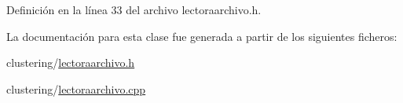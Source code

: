 Definición en la línea 33 del archivo lectoraarchivo.\-h.



La documentación para esta clase fue generada a partir de los siguientes ficheros\-:\begin{DoxyCompactItemize}
\item 
clustering/\hyperlink{lectoraarchivo_8h}{lectoraarchivo.\-h}\item 
clustering/\hyperlink{lectoraarchivo_8cpp}{lectoraarchivo.\-cpp}\end{DoxyCompactItemize}
